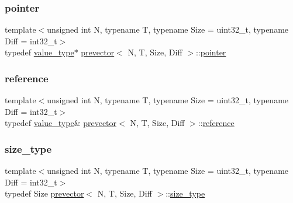 \mbox{\label{classprevector_ad9c63f0c4a27f8a3c1fc71e153cb93ad}} 
\subsubsection{\texorpdfstring{pointer}{pointer}}
{\footnotesize\ttfamily template$<$unsigned int N, typename T, typename Size = uint32\+\_\+t, typename Diff = int32\+\_\+t$>$ \\
typedef \mbox{\hyperlink{classprevector_aaab8519e15c3bdebdcc4bbc86fcff33c}{value\+\_\+type}}$\ast$ \mbox{\hyperlink{classprevector}{prevector}}$<$ N, T, Size, Diff $>$\+::\mbox{\hyperlink{classprevector_ad9c63f0c4a27f8a3c1fc71e153cb93ad}{pointer}}}

\mbox{\label{classprevector_a457464223499e5cad0ab1b8123d82109}} 
\subsubsection{\texorpdfstring{reference}{reference}}
{\footnotesize\ttfamily template$<$unsigned int N, typename T, typename Size = uint32\+\_\+t, typename Diff = int32\+\_\+t$>$ \\
typedef \mbox{\hyperlink{classprevector_aaab8519e15c3bdebdcc4bbc86fcff33c}{value\+\_\+type}}\& \mbox{\hyperlink{classprevector}{prevector}}$<$ N, T, Size, Diff $>$\+::\mbox{\hyperlink{classprevector_a457464223499e5cad0ab1b8123d82109}{reference}}}

\mbox{\label{classprevector_a7e0da95e6d1c878f6eeb572f4fc12524}} 
\subsubsection{\texorpdfstring{size\+\_\+type}{size\_type}}
{\footnotesize\ttfamily template$<$unsigned int N, typename T, typename Size = uint32\+\_\+t, typename Diff = int32\+\_\+t$>$ \\
typedef Size \mbox{\hyperlink{classprevector}{prevector}}$<$ N, T, Size, Diff $>$\+::\mbox{\hyperlink{classprevector_a7e0da95e6d1c878f6eeb572f4fc12524}{size\+\_\+type}}}

